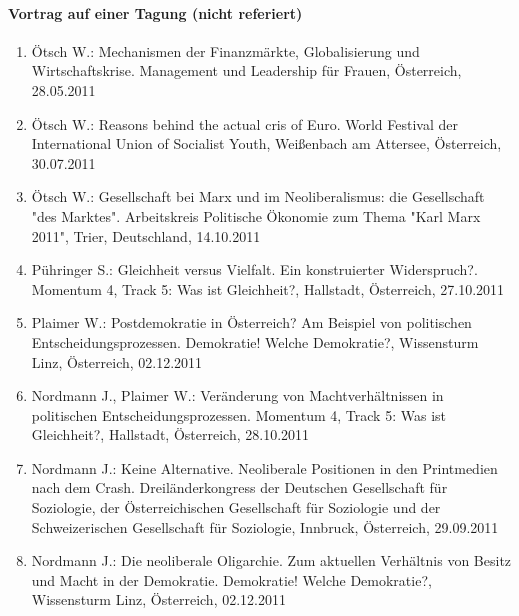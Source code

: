     \paragraph{Vortrag auf einer Tagung (nicht referiert)}
\begin{enumerate}
	\item Ötsch W.: Mechanismen der Finanzmärkte, Globalisierung und Wirtschaftskrise. Management und Leadership für Frauen, Österreich, 28.05.2011
	\item Ötsch W.: Reasons behind the actual cris of Euro. World Festival der International Union of Socialist Youth, Weißenbach am Attersee, Österreich, 30.07.2011
	\item Ötsch W.: Gesellschaft bei Marx und im Neoliberalismus: die Gesellschaft "des Marktes". Arbeitskreis Politische Ökonomie zum Thema "Karl Marx 2011", Trier, Deutschland, 14.10.2011
	\item Pühringer S.: Gleichheit versus Vielfalt. Ein konstruierter Widerspruch?. Momentum 4, Track 5: Was ist Gleichheit?, Hallstadt, Österreich, 27.10.2011
	\item Plaimer W.: Postdemokratie in Österreich? Am Beispiel von politischen Entscheidungsprozessen. Demokratie! Welche Demokratie?, Wissensturm Linz, Österreich, 02.12.2011
	\item Nordmann J., Plaimer W.: Veränderung von Machtverhältnissen in politischen Entscheidungsprozessen. Momentum 4, Track 5: Was ist Gleichheit?, Hallstadt, Österreich, 28.10.2011
	\item Nordmann J.: Keine Alternative. Neoliberale Positionen in den Printmedien nach dem Crash. Dreiländerkongress der Deutschen Gesellschaft für Soziologie, der Österreichischen Gesellschaft für Soziologie und der Schweizerischen Gesellschaft für Soziologie, Innbruck, Österreich, 29.09.2011
	\item Nordmann J.: Die neoliberale Oligarchie. Zum aktuellen Verhältnis von Besitz und Macht in der Demokratie. Demokratie! Welche Demokratie?, Wissensturm Linz, Österreich, 02.12.2011
\end{enumerate}
